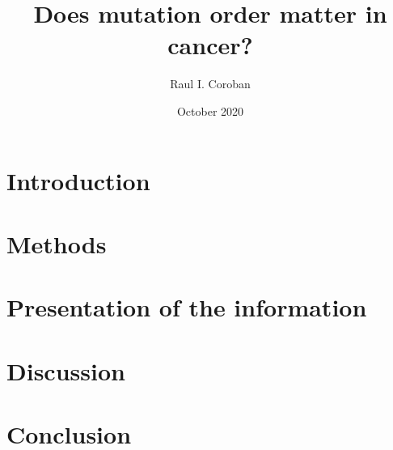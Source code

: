\documentclass[a4paper]{article}
\title{Does mutation order matter in cancer?}
\author{Raul I. Coroban}
\date{October 2020}
\begin{document}
\maketitle

\begin{abstract}

\end{abstract}

\section{Introduction}


\section{Methods}


\section{Presentation of the information}


\section{Discussion}


\section{Conclusion}




\end{document}
